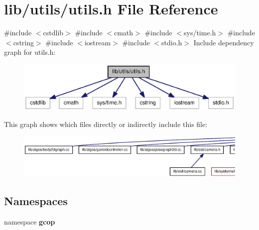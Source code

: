 \section{lib/utils/utils.h \-File \-Reference}
\label{utils_8h}
{\ttfamily \#include $<$cstdlib$>$}\*
{\ttfamily \#include $<$cmath$>$}\*
{\ttfamily \#include $<$sys/time.\-h$>$}\*
{\ttfamily \#include $<$cstring$>$}\*
{\ttfamily \#include $<$iostream$>$}\*
{\ttfamily \#include $<$stdio.\-h$>$}\*
\-Include dependency graph for utils.\-h\-:
\nopagebreak
\begin{figure}[H]
\begin{center}
\leavevmode
\includegraphics[width=350pt]{utils_8h__incl}
\end{center}
\end{figure}
\-This graph shows which files directly or indirectly include this file\-:
\nopagebreak
\begin{figure}[H]
\begin{center}
\leavevmode
\includegraphics[width=350pt]{utils_8h__dep__incl}
\end{center}
\end{figure}
\subsection*{\-Namespaces}
\begin{DoxyCompactItemize}
\item 
namespace {\bf gcop}
\end{DoxyCompactItemize}
